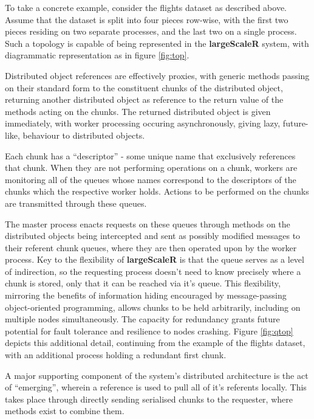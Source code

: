 To take a concrete example, consider the flights dataset as described above.
Assume that the dataset is split into four pieces row-wise, with the first two pieces residing on two separate processes, and the last two on a single process.
Such a topology is capable of being represented in the \textbf{largeScaleR} system, with diagrammatic representation as in figure \ref{fig:top}.



Distributed object references are effectively proxies, with generic methods passing on their standard form to the constituent chunks of the distributed object, returning another distributed object as reference to the return value of the methods acting on the chunks.
The returned distributed object is given immediately, with worker processing occuring asynchronously, giving lazy, future-like, behaviour to distributed objects\cite{baker1977incremental}.

Each chunk has a ``descriptor'' - some unique name that exclusively references that chunk.
When they are not performing operations on a chunk, workers are monitoring all of the queues whose names correspond to the descriptors of the chunks which the respective worker holds.
Actions to be performed on the chunks are transmitted through these queues.

The master process enacts requests on these queues through methods on the distributed objects being intercepted and sent as possibly modified messages to their referent chunk queues, where they are then operated upon by the worker process.
Key to the flexibility of \textbf{largeScaleR} is that the queue serves as a level of indirection, so the requesting process doesn't need to know precisely where a chunk is stored, only that it can be reached via it's queue.
This flexibility, mirroring the benefits of information hiding encouraged by message-passing object-oriented programming, allows chunks to be held arbitrarily, including on multiple nodes simultaneously.
The capacity for redundancy grants future potential for fault tolerance and resilience to nodes crashing.
Figure \ref{fig:qtop} depicts this additional detail, continuing from the example of the flights dataset, with an additional process holding a redundant first chunk.



A major supporting component of the system's distributed architecture is the act of ``emerging'', wherein a reference is used to pull all of it's referents locally\cite{emmerich2000engineering}.
This takes place through directly sending serialised chunks to the requester, where methods exist to combine them.

